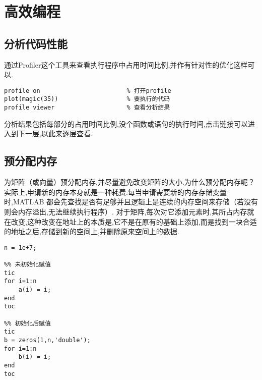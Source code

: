 \section{高效编程}



\subsection{分析代码性能}
 通过Profiler这个工具来查看执行程序中占用时间比例,并作有针对性的优化这样可以.

\vspace{-0.8cm}
\begin{lstlisting}[caption = 用Profiler分析代码性能] 
profile on                        % 打开profile
plot(magic(35))                   % 要执行的代码
profile viewer                    % 查看分析结果
\end{lstlisting}

分析结果包括每部分的占用时间比例,没个函数或语句的执行时间,点击链接可以进入到下一层,以此来逐层查看.





\subsection{预分配内存}
 为矩阵（或向量）预分配内存,并尽量避免改变矩阵的大小.为什么预分配内存呢？实际上,申请新的内存本身就是一种耗费.每当申请需要新的内存存储变量时,MATLAB 都会先查找是否有足够并且逻辑上是连续的内存空间来存储（若没有则会内存溢出,无法继续执行程序）. 对于矩阵,每次对它添加元素时,其所占内存就在改变,这种改变在地址上的本质是,它不是在原有的基础上添加,而是找到一块合适的地址之后,存储到新的空间上,并删除原来空间上的数据.

\vspace{-0.8cm}
\begin{lstlisting}[caption = 是否预分配内存效率对比]
n = 1e+7;

%% 未初始化赋值
tic
for i=1:n
    a(i) = i;
end
toc

%% 初始化后赋值
tic
b = zeros(1,n,'double');
for i=1:n
    b(i) = i;
end
toc
\end{lstlisting}

